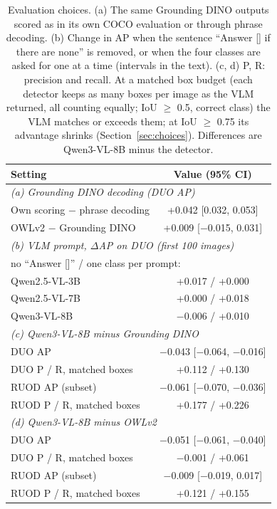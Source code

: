 \begin{table}[t]
\centering
\small
\setlength{\tabcolsep}{3pt}
\begin{tabular}{lc}
\toprule
Setting & Value (95\% CI) \\
\midrule
\multicolumn{2}{l}{\textit{(a) Grounding DINO decoding (DUO AP)}} \\
Own scoring $-$ phrase decoding & +0.042 [0.032, 0.053] \\
OWLv2 $-$ Grounding DINO & +0.009 [$-$0.015, 0.031] \\
\midrule
\multicolumn{2}{l}{\textit{(b) VLM prompt, $\Delta$AP on DUO (first 100 images)}} \\
\multicolumn{2}{l}{\quad no ``Answer []'' / one class per prompt:} \\
\quad Qwen2.5-VL-3B & +0.017 / +0.000 \\
\quad Qwen2.5-VL-7B & +0.000 / +0.018 \\
\quad Qwen3-VL-8B & $-$0.006 / +0.010 \\
\midrule
\multicolumn{2}{l}{\textit{(c) Qwen3-VL-8B minus Grounding DINO}} \\
DUO AP & $-$0.043 [$-$0.064, $-$0.016] \\
DUO P / R, matched boxes & +0.112 / +0.130 \\
RUOD AP (subset) & $-$0.061 [$-$0.070, $-$0.036] \\
RUOD P / R, matched boxes & +0.177 / +0.226 \\
\midrule
\multicolumn{2}{l}{\textit{(d) Qwen3-VL-8B minus OWLv2}} \\
DUO AP & $-$0.051 [$-$0.061, $-$0.040] \\
DUO P / R, matched boxes & $-$0.001 / +0.061 \\
RUOD AP (subset) & $-$0.009 [$-$0.019, 0.017] \\
RUOD P / R, matched boxes & +0.121 / +0.155 \\
\bottomrule
\end{tabular}
\caption{Evaluation choices. (a) The same Grounding DINO outputs scored as in its own COCO evaluation or through phrase decoding. (b) Change in AP when the sentence ``Answer [] if there are none'' is removed, or when the four classes are asked for one at a time (intervals in the text). (c, d) P, R: precision and recall. At a matched box budget (each detector keeps as many boxes per image as the VLM returned, all counting equally; IoU $\geq$ 0.5, correct class) the VLM matches or exceeds them; at IoU $\geq$ 0.75 its advantage shrinks (Section~\ref{sec:choices}). Differences are Qwen3-VL-8B minus the detector.}
\label{tab:choices}
\end{table}
